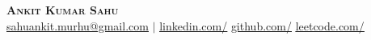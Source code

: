 \begin{center}
  \textbf{\Huge \scshape Ankit Kumar Sahu} \\
  \small \href{mailto:sahuankit.murhu@gmail.com}{\underline{sahuankit.murhu@gmail.com}} $|$
  \href{https://www.linkedin.com/in/kmrankitt/}{\underline{linkedin.com/}}
  \href{https://github.com/kmr-ankitt}{\underline{github.com/}}
  \href{https://leetcode.com/u/kmrankit/}{\underline{leetcode.com/}}
\end{center}
